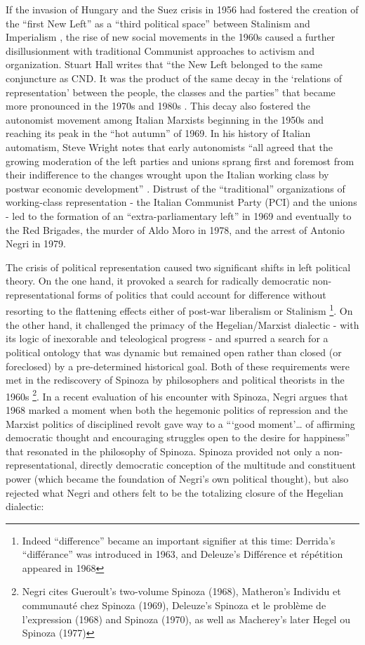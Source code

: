 \documentclass[12pt,oneside]{memoir}
\begin{document}
If the invasion of Hungary and the Suez crisis in 1956 had fostered the creation of the ``first New Left'' as a ``third political space'' between Stalinism and Imperialism \citep[117]{Hall1990}, the rise of new social movements in the 1960s caused a further disillusionment with traditional Communist approaches to activism and organization. Stuart Hall writes that ``the New Left belonged to the same conjuncture as CND. It was the product of the same decay in the `relations of representation' between the people, the classes and the parties'' that became more pronounced in the 1970s and 1980s \citep[135]{Hall1990}. This decay also fostered the autonomist movement among Italian Marxists beginning in the 1950s and reaching its peak in the ``hot autumn'' of 1969. In his history of Italian automatism, Steve Wright notes that early autonomists ``all agreed that the growing moderation of the left parties and unions sprang first and foremost from their indifference to the changes wrought upon the Italian working class by postwar economic development'' \citep[20-21]{Wright2002}. Distrust of the ``traditional'' organizations of working-class representation - the Italian Communist Party (PCI) and the unions - led to the formation of an ``extra-parliamentary left'' in 1969 \citep[126]{Wright2002} and eventually to the Red Brigades, the murder of Aldo Moro in 1978, and the arrest of Antonio Negri in 1979.

The crisis of political representation caused two significant shifts in left political theory. On the one hand, it provoked a search for radically democratic non-representational forms of politics that could account for difference without resorting to the flattening effects either of post-war liberalism or Stalinism \footnote{Indeed ``difference'' became an important signifier at this time: Derrida's ``différance'' was introduced in 1963, and Deleuze's Différence et répétition appeared in 1968}. On the other hand, it challenged the primacy of the Hegelian/Marxist dialectic - with its logic of inexorable and teleological progress - and spurred a search for a political ontology that was dynamic but remained open rather than closed (or foreclosed) by a pre-determined historical goal. Both of these requirements were met in the rediscovery of Spinoza by philosophers and political theorists in the 1960s \footnote{Negri cites Gueroult's two-volume Spinoza (1968), Matheron's Individu et communauté chez Spinoza (1969), Deleuze's Spinoza et le problème de l'expression (1968) and Spinoza (1970), as well as  Macherey's later Hegel ou Spinoza (1977)}. In a recent evaluation of his encounter with Spinoza, Negri argues that 1968 marked a moment when both the hegemonic politics of repression and the Marxist politics of disciplined revolt gave way to a ```good moment'{\ldots} of affirming democratic thought and encouraging struggles open to the desire for happiness'' \citep[vii]{Negri2020} that resonated in the philosophy of Spinoza. Spinoza provided not only a non-representational, directly democratic conception of the multitude and constituent power (which became the foundation of Negri's own political thought), but also rejected what Negri and others felt to be the totalizing closure of the Hegelian dialectic: 
\end{document}
